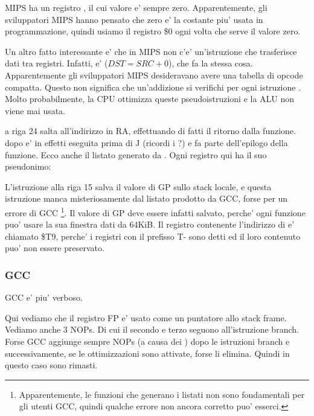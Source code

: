 MIPS ha un registro , il cui valore e' sempre zero.
Apparentemente, gli sviluppatori MIPS hanno pensato che zero e' la costante piu' usata in programmazione, quindi usiamo il registro \$0
 ogni volta che serve il valore zero.

Un altro fatto interessante e' che in MIPS non c'e' un'istruzione che trasferisce dati tra registri.
Infatti,  e'  ($DST=SRC+0$), che fa la stessa cosa.
Apparentemente gli sviluppatori MIPS desideravano avere una tabella di opcode compatta.
Questo non significa che un'addizione si verifichi per ogni istruzione .
Molto probabilmente, la \ac{CPU} ottimizza queste pseudoistruzioni e la \ac{ALU} non viene mai usata.


 a riga 24 salta all'indirizzo in \ac{RA}, effettuando di fatti il ritorno dalla funzione.
 dopo  e' in effetti eseguita prima di J (ricordi i ?) e fa parte dell'epilogo della funzione.
Ecco anche il listato generato da \IDA. Ogni registro qui ha il suo pseudonimo:



L'istruzione alla riga 15 salva il valore di GP sullo stack locale, e questa istruzione manca misteriosamente dal listato prodotto da GCC, forse per un errore di GCC
\footnote{Apparentemente, le funzioni che generano i listati non sono fondamentali per gli utenti GCC, quindi qualche errore
non ancora corretto puo' esserci.}.
Il valore di GP deve essere infatti salvato, perche' ogni funzione puo' usare la sua finestra dati da 64KiB.
Il registro contenente l'indirizzo di \puts e' chiamato \$T9, perche' i registri con il prefisso T- sono detti 
 ed il loro contenuto puo' non essere preservato.

\subsubsection{\NonOptimizing GCC}

\NonOptimizing GCC e' piu' verboso.



Qui vediamo che il registro FP e' usato come un puntatore allo stack frame.
Vediamo anche 3 \ac{NOP}s.
Di cui il secondo e terzo seguono all'istruzione branch.
Forse GCC aggiunge sempre \ac{NOP}s (a causa dei ) dopo le istruzioni branch
e successivamente, se le ottimizzazioni sono attivate, forse li elimina.
Quindi in questo caso sono rimasti.

